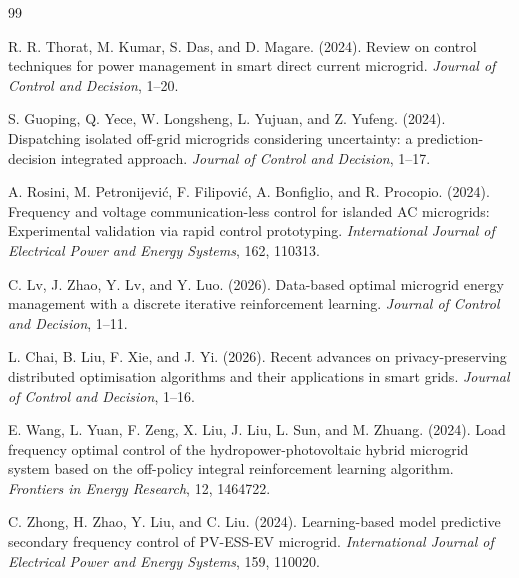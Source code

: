 \documentclass[]{interact}
\theoremstyle{plain}%
\theoremstyle{definition}
\theoremstyle{remark}
\begin{document}

\begin{thebibliography}{99}

R. R. Thorat, M. Kumar, S. Das, and D. Magare. (2024). Review on control techniques for power management in smart direct current microgrid. \emph{Journal of Control and Decision}, 1–20.

S. Guoping, Q. Yece, W. Longsheng, L. Yujuan, and Z. Yufeng. (2024). Dispatching isolated off-grid microgrids considering uncertainty: a prediction-decision integrated approach. \emph{Journal of Control and Decision}, 1–17.

A. Rosini, M. Petronijević, F. Filipović, A. Bonfiglio, and R. Procopio. (2024). Frequency and voltage communication-less control for islanded AC microgrids: Experimental validation via rapid control prototyping. \emph{International Journal of Electrical Power and Energy Systems}, 162, 110313.

C. Lv, J. Zhao, Y. Lv, and Y. Luo. (2026). Data-based optimal microgrid energy management with a discrete iterative reinforcement learning. \emph{Journal of Control and Decision}, 1–11.

L. Chai, B. Liu, F. Xie, and J. Yi. (2026). Recent advances on privacy-preserving distributed optimisation algorithms and their applications in smart grids. \emph{Journal of Control and Decision}, 1–16.

E. Wang, L. Yuan, F. Zeng, X. Liu, J. Liu, L. Sun, and M. Zhuang. (2024). Load frequency optimal control of the hydropower-photovoltaic hybrid microgrid system based on the off-policy integral reinforcement learning algorithm. \emph{Frontiers in Energy Research}, 12, 1464722.

C. Zhong, H. Zhao, Y. Liu, and C. Liu. (2024). Learning-based model predictive secondary frequency control of PV-ESS-EV microgrid. \emph{International Journal of Electrical Power and Energy Systems}, 159, 110020.


\end{thebibliography}
\end{document}

